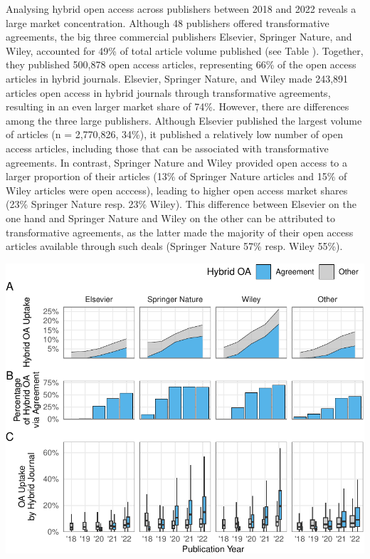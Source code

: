 \documentclass[a4paper,man,floatsintext,longtable,noextraspace,12pt]{apa6}
\begin{document}
Analysing hybrid open access across publishers between 2018 and 2022
reveals a large market concentration. Although 48 publishers offered
transformative agreements, the big three commercial publishers Elsevier,
Springer Nature, and Wiley, accounted for 49\% of total article volume
published (see Table ). Together, they published 500,878 open access
articles, representing 66\% of the open access articles in hybrid
journals. Elsevier, Springer Nature, and Wiley made 243,891 articles
open access in hybrid journals through transformative agreements,
resulting in an even larger market share of 74\%. However, there are
differences among the three large publishers. Although Elsevier
published the largest volume of articles (n = 2,770,826, 34\%), it
published a relatively low number of open access articles, including
those that can be associated with transformative agreements. In
contrast, Springer Nature and Wiley provided open access to a larger
proportion of their articles (13\% of Springer Nature articles and 15\%
of Wiley articles were open acccess), leading to higher open access
market shares (23\% Springer Nature resp. 23\% Wiley). This difference
between Elsevier on the one hand and Springer Nature and Wiley on the
other can be attributed to transformative agreements, as the latter made
the majority of their open access articles available through such deals
(Springer Nature 57\% resp. Wiley 55\%).

\begin{center}\includegraphics[width=0.99\linewidth]{fig/unnamed-chunk-6-1} \end{center}
\end{document}
